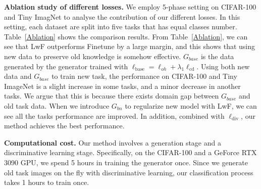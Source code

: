 \documentclass[10pt,twocolumn,letterpaper]{article}
\begin{document}
\textbf{Ablation study of different losses.}
We employ 5-phase setting on CIFAR-100 and Tiny ImagNet to analyse the contribution of our different losses. In this setting, each dataset are split into five tasks that has equal classes number. Table~\ref{Ablation} shows the comparison results.
From Table~\ref{Ablation}, we can see that LwF outperforms Finetune by a large margin, and this shows that using new data to preserve old knowledge is somehow effective.
$G_{base}$ is the data generated by the generator trained with $\ell_{\text{base}} = \ell_{oh} +\lambda_1\ell_{\text{cd}} $. Using both new data and $G_{base}$ to train new task,
the performance on CIFAR-100 and Tiny ImageNet is a slight increase in some tasks, and a minor decrease in another tasks. We argue that this is because there exists domain gap between $G_{base}$ and old task data. When we introduce $G_{bn}$ to regularize new model with LwF, we can see all the tasks performance are improved. In addition, combined with $\ell_{\text{div}}$, our method achieves the best performance.


\begin{table}[t]
\scriptsize
\renewcommand\arraystretch{1.15}
  \begin{center}
    \caption{\small{Average class Top-1 accuracy on CUB-200-2011 under 2-phase setting: 10 classes for old task and 10 classes for new task.}}
    \vspace{-3mm}
    \label{deepinversion}
  \end{center}
  \vspace{-5mm}
\end{table}

\textbf{Computational cost.} Our method involves a generation stage and a discriminative learning stage. Specifically, on the CIFAR-100 and a GeForce RTX 3090 GPU, we spend 5 hours in training the generator once. Since we generate old task images on the fly with discriminative learning, our classification process takes 1 hours to train once.
\end{document}
